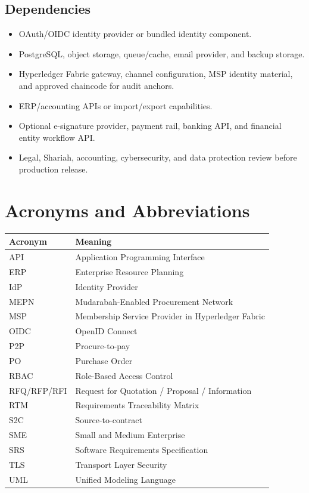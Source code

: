 \documentclass[11pt,a4paper]{article}
\begin{document}
\subsection{Dependencies}
\begin{itemize}
  \item OAuth/OIDC identity provider or bundled identity component.
  \item PostgreSQL, object storage, queue/cache, email provider, and backup storage.
  \item Hyperledger Fabric gateway, channel configuration, MSP identity material, and approved chaincode for audit anchors.
  \item ERP/accounting APIs or import/export capabilities.
  \item Optional e-signature provider, payment rail, banking API, and financial entity workflow API.
  \item Legal, Shariah, accounting, cybersecurity, and data protection review before production release.
\end{itemize}

\section{Acronyms and Abbreviations}
\begin{longtable}{@{}p{}p{}@{}}
\rowcolor{gray!18}\textbf{Acronym} & \textbf{Meaning} \\ \hline
API & Application Programming Interface \\ \hline
ERP & Enterprise Resource Planning \\ \hline
IdP & Identity Provider \\ \hline
MEPN & Mudarabah-Enabled Procurement Network \\ \hline
MSP & Membership Service Provider in Hyperledger Fabric \\ \hline
OIDC & OpenID Connect \\ \hline
P2P & Procure-to-pay \\ \hline
PO & Purchase Order \\ \hline
RBAC & Role-Based Access Control \\ \hline
RFQ/RFP/RFI & Request for Quotation / Proposal / Information \\ \hline
RTM & Requirements Traceability Matrix \\ \hline
S2C & Source-to-contract \\ \hline
SME & Small and Medium Enterprise \\ \hline
SRS & Software Requirements Specification \\ \hline
TLS & Transport Layer Security \\ \hline
UML & Unified Modeling Language \\ \hline
\end{longtable}
\end{document}
